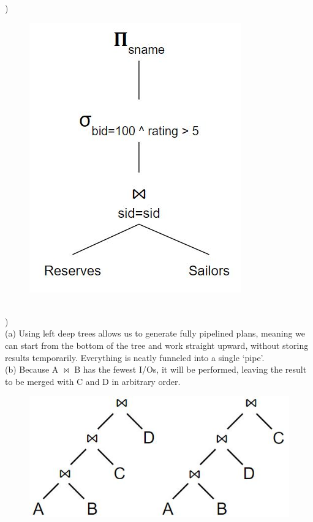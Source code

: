 \documentclass[12pt]{article}
\begin{document}
)\\
\begin{figure}[h!]
  \centering
  \includegraphics[scale=.6]{Exam2Q7.JPG}
\end{figure}


\hrulefill\\


)\\
\indent (a) Using left deep trees allows us to generate fully pipelined plans, meaning we can start from the bottom of the tree and work straight upward, without storing results temporarily. Everything is neatly funneled into a single `pipe'.\\

\indent (b) Because A $\bowtie$ B has the fewest I/Os, it will be performed, leaving the result to be merged with C and D in arbitrary order.\\
\begin{figure}[h!]
  \centering
  \includegraphics[scale=.6]{Exam2Q8b.JPG}
\end{figure}
\end{document}
